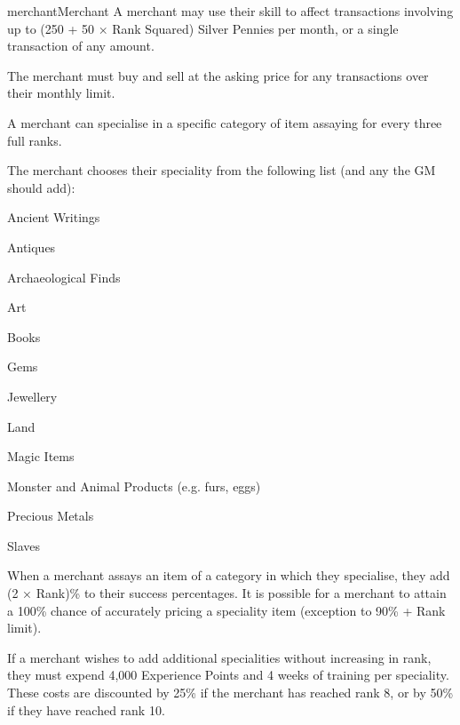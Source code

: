 \begin{Skill}[1.1]{merchant}{Merchant}
A merchant may use their skill to affect transactions involving up to
(250 + 50 × Rank Squared) Silver Pennies per month, or a single
transaction of any amount.

The merchant must buy and sell at the asking price for any
transactions over their monthly limit.

A merchant can specialise in a specific category of item assaying for
every three full ranks.

The merchant chooses their speciality from the following list (and any
the GM should add):

\begin{Enumerate}

\item Ancient Writings 
\item Antiques 
\item Archaeological Finds 
\item Art 
\item Books 
\item Gems 
\item Jewellery 
\item Land
\item Magic Items 
\item Monster and Animal Products (e.g. furs, eggs) 
\item Precious Metals 
\item Slaves 

\end{Enumerate}

When a merchant assays an item of a category in which they specialise,
they add (2 × Rank)\% to their success percentages.  It is possible
for a merchant to attain a 100\% chance of accurately pricing a
speciality item (exception to 90\% + Rank limit).

If a merchant wishes to add additional specialities without increasing
in rank, they must expend 4,000 Experience Points and 4 weeks of
training per speciality.  These costs are discounted by 25\% if the
merchant has reached rank 8, or by 50\% if they have reached rank 10.

\end{Skill}
